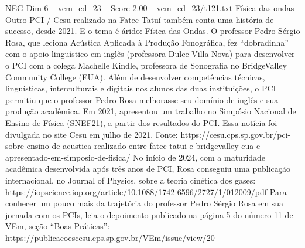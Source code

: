 \begin{textsample}{NEG Dim 6 – vem\_ed\_23 – Score 2.00 – vem\_ed\_23/t121.txt}  \label{ex:f6_neg_035}
Física das ondas Outro PCI / Cesu realizado na Fatec Tatuí também conta uma história de sucesso, desde 2021.
E o tema é árido: Física das Ondas.
O professor Pedro Sérgio Rosa, que leciona Acústica Aplicada à Produção Fonográfica, fez “dobradinha” com o apoio linguístico em inglês (professora Dulce Villa Nova) para desenvolver o PCI com a colega Machelle Kindle, professora de Sonografia no BridgeValley Community College (EUA).
Além de desenvolver competências técnicas, linguísticas, interculturais e digitais nos alunos das duas instituições, o PCI permitiu que o professor Pedro Rosa melhorasse seu domínio de inglês e sua produção acadêmica.
Em 2021, apresentou um trabalho no Simpósio Nacional de Ensino de Física (SNEF21), a partir dos resultados do PCI.
Essa notícia foi divulgada no site Cesu em julho de 2021.
Fonte: https://cesu.cps.sp.gov.br/pci-sobre-ensino-de-acustica-realizado-entre-fatec-tatui-e-bridgevalley-eua-e-apresentado-em-simposio-de-fisica/ No início de 2024, com a maturidade acadêmica desenvolvida após três anos de PCI, Rosa conseguiu uma publicação internacional, no Journal of Physics, sobre a teoria cinética dos gases: https://iopscience.iop.org/article/10.1088/1742-6596/2727/1/012009/pdf Para conhecer um pouco mais da trajetória do professor Pedro Sérgio Rosa em sua jornada com os PCIs, leia o depoimento publicado na página 5 do número 11 de VEm, seção “Boas Práticas”: https://publicacoescesu.cps.sp.gov.br/VEm/issue/view/20

\end{textsample}
